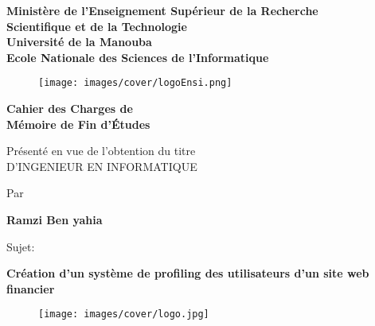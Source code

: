 \documentclass[12pt,a4paper,oneside]{report}
\begin{document}
 
\thispagestyle{empty}

\begin{center}
\textbf{Ministère de l'Enseignement Supérieur de la Recherche \\Scientifique et de la Technologie}\\
\vspace*{1mm}
\textbf{Université de la Manouba}\\
\vspace*{1mm}
\textbf{Ecole Nationale des Sciences de l'Informatique}\\
\end{center}

\vspace*{1mm}

\begin{figure}[h]
\centering
\texttt{[image: images/cover/logoEnsi.png]}
\end{figure}



\vspace*{1mm}

\begin{center}
\textbf{Cahier des Charges de\\ Mémoire de Fin d'Études }\\


\vspace*{1mm}
\begin{center}
{\large{Présenté en vue de l'obtention du titre\\
D’INGENIEUR EN INFORMATIQUE}}
\end{center}

\begin{center}
{Par}
\end{center}
\begin{center}
\textbf{{{  Ramzi Ben yahia }}}

\end{center}


\begin{center}
{Sujet:}
\end{center}

\textbf{\Large {Création d’un système de profiling des utilisateurs d’un site web financier }}
\end{center}
\vspace*{2mm}
\begin{figure}[h]
\centering
\texttt{[image: images/cover/logo.jpg]}
\end{figure}
\end{document}
